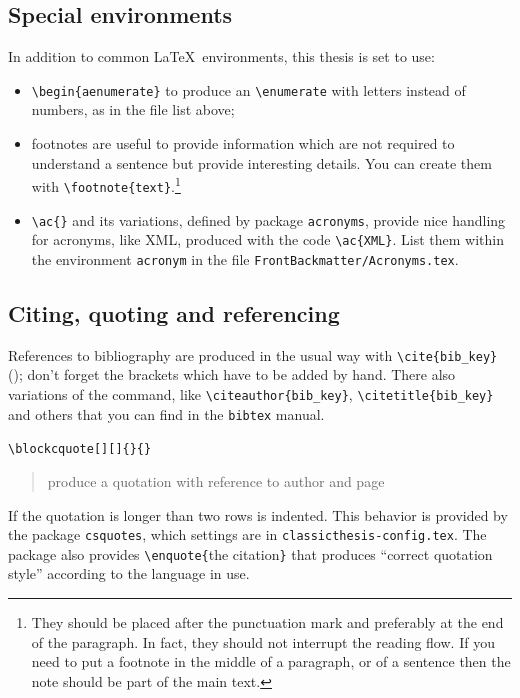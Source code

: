 \subsection{Special environments}\label{subsec:special_env}
In addition to common \LaTeX\ environments, this thesis is set to use:
\begin{itemize}
	\item \verb!\begin{aenumerate}! to produce an \verb!\enumerate! with letters instead of numbers, as in the file list above;
	\item footnotes are useful to provide information which are not required to understand a sentence but provide interesting details. You can create them with \verb!\footnote{text}!.\footnote{They should be placed after the punctuation mark and preferably at the end of the paragraph. In fact, they should not interrupt the reading flow. If you need to put a footnote in the middle of a paragraph, or of a sentence then the note should be part of the main text.}
	\item \verb!\ac{}! and its variations, defined by package \verb!acronyms!, provide nice handling for acronyms, like \ac{XML}, produced with the code \verb!\ac{XML}!.
	List them within the environment \verb!acronym! in the file \verb!FrontBackmatter/Acronyms.tex!.
\end{itemize}

\subsection{Citing, quoting and referencing}
References to bibliography are produced in the usual way with \verb!\cite{bib_key}! (\cite{bringhurst:2002}); don't forget the brackets which have to be added by hand.
There also variations of the command, like \verb!\citeauthor{bib_key}!, \verb!\citetitle{bib_key}! and others that you can find in the \verb!bibtex! manual.

\verb!\blockcquote[][]{}{}! \blockcquote[see][p. 111]{bringhurst:2002}{produce a quotation with reference to author and page}.
If the quotation is longer than two rows is indented.
This behavior is provided by the package \verb!csquotes!, which settings are in \verb!classicthesis-config.tex!. 
The package also provides \verb!\enquote{!the citation\verb!}! that produces \enquote{correct quotation style} according to the language in use.

